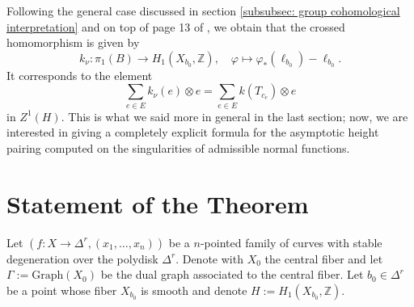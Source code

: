 \documentclass[a4paper,12 pt,titlepage,twoside]{book}
\newcommand{\numberset}{\mathbb}
\newcommand{\Z}{\numberset{Z}}
\DeclareMathOperator{\sing}{sing}
\DeclareMathOperator{\IH}{IH}
\theoremstyle{plain}
\theoremstyle{theorem}
\theoremstyle{definition}
\theoremstyle{remark}
\begin{document}
	\begin{center}
	\end{center}
	Following the general case discussed in section \ref{subsubsec: group cohomological interpretation} and on top of page 13 of \cite{MR1418577}, we obtain that the crossed homomorphism is given by $$k_\nu \colon \pi_1(B) \rightarrow H_1(X_{b_0},\Z), \quad \varphi \mapsto \varphi_*(\ell_{b_0}) - \ell_{b_0}.$$ It corresponds to the element $$\sum_{e \in E} k_\nu(e) \otimes e = \sum_{e \in E} k(T_{c_e}) \otimes e$$ in $Z^1(H).$
	This is what we said more in general in the last section; now, we are interested in giving a completely explicit formula for the asymptotic height pairing computed on the singularities of admissible normal functions. 
	
	\section{Statement of the Theorem}\label{sec: Theorem note}
	Let $(f\colon X \rightarrow \Delta^r, (x_1, \dots, x_n))$ be a $n$-pointed family of curves with stable degeneration over the polydisk $\Delta^r$. Denote with $X_0$ the central fiber and let $\Gamma := \text{Graph}(X_0)$ be the dual graph associated to the central fiber. Let $b_0 \in\Delta^r$ be a point whose fiber $X_{b_0}$ is smooth and denote $H:= H_1(X_{b_0},\Z)$. 
	
\end{document}
